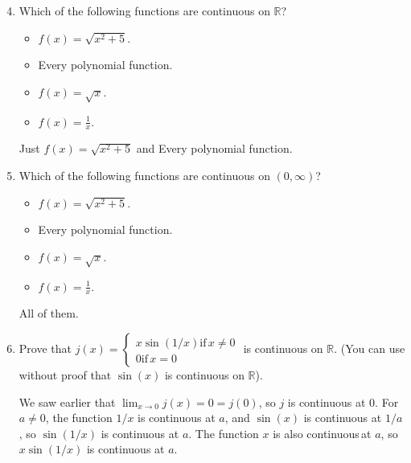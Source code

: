 \documentclass[12pt]{amsart}
\def\cts{continuous\,}
\newcommand{\R}{{\mathbb{R}}}
\numberwithin{equation}{section}
\theoremstyle{plain} %
\theoremstyle{definition}
\theoremstyle{remark}
\begin{document}
 

 
 
 
 \begin{enumerate}
 \setcounter{enumi}{3}
 \item Which of the following functions are continuous on $\R$?
\begin{multicols}{2} 
\begin{itemize}
 \item $f(x)=\sqrt{ x^2 +5}$.
 \item Every polynomial function.
  \item $f(x) = \sqrt{x}$.
  \item $f(x)=\frac{1}{x}$.
 \end{itemize}
 \end{multicols}
 
\begin{framed}
Just $f(x)=\sqrt{ x^2 +5}$ and Every polynomial function.
\end{framed}
 
 
 
 \item Which of the following functions are continuous on $(0,\infty)$?
 \begin{multicols}{2} 
 \begin{itemize}
 \item $f(x)=\sqrt{ x^2 +5}$.
 \item Every polynomial function.
  \item $f(x) = \sqrt{x}$.
  \item $f(x)=\frac{1}{x}$.
 \end{itemize}
 \end{multicols}
 
\begin{framed}
All of them.
\end{framed}
 
 \item Prove that $j(x) =\begin{cases} x \sin(1/x) \text{if} \, x\neq 0 \\ 0 \text{if} \, x=0\end{cases}$ is continuous on $\R$. (You can use without proof that $\sin(x)$ is continuous on $\R$).
 
 
 \begin{framed}
We saw earlier that $\lim_{x\to 0} j(x) = 0 = j(0)$, so $j$ is continuous at $0$. For $a\neq 0$, the function $1/x$ is continuous at $a$, and $\sin(x)$ is continuous at $1/a$, so $\sin(1/x)$ is continuous at $a$. The function $x$ is also \cts at $a$, so $x\sin(1/x)$ is continuous at $a$.
\end{framed}
 

\end{enumerate}
\end{document}
